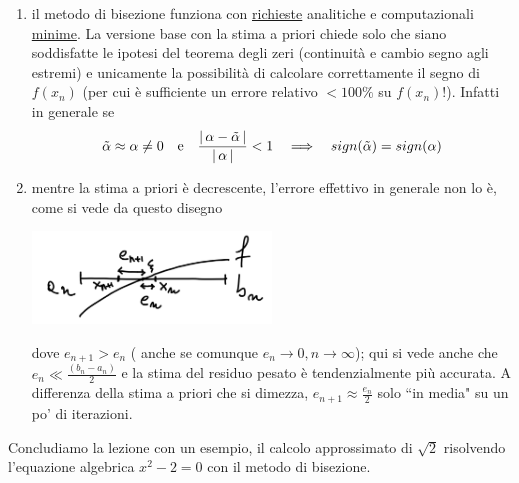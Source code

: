 \documentclass[12pt]{article}
\DeclarePairedDelimiter{\abs}{\lvert}{\rvert}
\begin{document}
\begin{enumerate}[label=\Alph*)]
\item il metodo di bisezione funziona con \uline{richieste} analitiche e computazionali \uline{minime}.
La versione base con la stima a priori chiede solo che siano soddisfatte le ipotesi del teorema degli zeri (continuità e cambio segno agli estremi) e unicamente la possibilità di calcolare correttamente il segno di $f(x_n)$ (per cui è sufficiente un errore relativo $<100\%$ su $f(x_n)!$). Infatti in generale se 
\[\tilde{\alpha} \approx \alpha \ne 0 \quad \text{e} \quad \frac{\abs{\,\alpha-\tilde{\alpha}\,}}{\abs{\,\alpha\,}}<1 \quad \Longrightarrow \quad sign(\tilde{\alpha})=sign(\alpha)\]

\item mentre la stima a priori è decrescente, l'errore effettivo in generale non lo è, come si vede da questo disegno
\begin{center}
    \includegraphics[width=0.5\textwidth]{grafo3.png}\par
\end{center}
 dove $e_{n+1}>e_n$ ( anche se comunque $e_n \rightarrow 0, n \rightarrow \infty$); qui si vede anche che $e_n\ll\frac{(b_n-a_n)}{2}$ e la stima del residuo pesato è tendenzialmente più accurata. A differenza della stima a priori che si dimezza, $e_{n+1}\approx\frac{e_n}{2}$ solo ``in media" su un po' di iterazioni.
\end{enumerate}

Concludiamo la lezione con un esempio, il calcolo approssimato di $\sqrt{2}$ risolvendo l'equazione algebrica $x^2 -2 = 0$ con il metodo di bisezione.\newline
\end{document}
